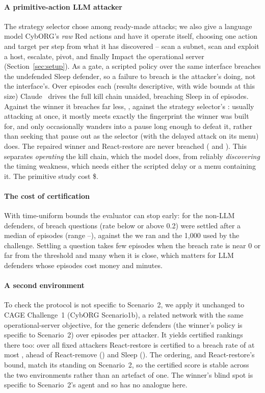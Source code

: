 \documentclass[conference,compsoc]{IEEEtran}
\begin{document}
\paragraph{A primitive-action LLM attacker}
The strategy selector chose among ready-made attacks; we also give a language model
CybORG's \emph{raw} Red actions and have it operate itself, choosing one action and target
per step from what it has discovered -- scan a subnet, scan and exploit a host, escalate,
pivot, and finally Impact the operational server (Section~\ref{sec:setup}). As a gate, a
scripted policy over the same interface breaches the undefended Sleep defender, so a failure
to breach is the attacker's doing, not the interface's. Over \PrimSleepEps{} episodes each
(results descriptive, with wide bounds at this size) Claude~\PrimModel{} drives the full
kill chain unaided, breaching Sleep in \PrimSleepBreach{} of episodes. Against the winner it
breaches far less, \PrimChampBreach{}, against the strategy selector's \AhChampBreach: usually
attacking at once, it mostly meets exactly the fingerprint the winner was built for, and only
occasionally wanders into a pause long enough to defeat it, rather than seeking that pause out
as the selector (with the delayed attack on its menu) does. The repaired winner and
React-restore are never breached (\PrimFixBreach{} and \PrimRestoreBreach). This separates
\emph{operating} the kill chain, which the model does, from reliably \emph{discovering} the
timing weakness, which needs either the scripted delay or a menu containing it. The primitive
study cost \$\PrimCost.

\paragraph{The cost of certification}
With time-uniform bounds the evaluator can stop early: for the non-LLM defenders,
\CgStopResolved{} of \CgStopPairs{} breach questions (rate below or above 0.2) were settled
after a median of \CgStopMedian{} episodes (range \CgStopMin--\CgStopMax), against the
\CgEpisodes{} we ran and the 1,000 used by the challenge. Settling a question takes few
episodes when the breach rate is near 0 or far from the threshold and many when it is
close, which matters for LLM defenders whose episodes cost money and minutes.

\paragraph{A second environment}
To check the protocol is not specific to Scenario~2, we apply it unchanged to CAGE
Challenge~1 (CybORG Scenario1b), a related network with the same operational-server
objective, for the \EnvBDefenders{} generic defenders (the winner's policy is specific to
Scenario~2) over \EnvBEps{} episodes per attacker. It yields certified rankings there too:
over all fixed attackers React-restore is certified to a breach rate of at most
\EnvBRestoreCert, ahead of React-remove (\EnvBRemoveCert) and Sleep (\EnvBSleepCert). The
ordering, and React-restore's bound, match its standing on Scenario~2, so the certified
score is stable across the two environments rather than an artefact of one. The winner's
blind spot is specific to Scenario~2's agent and so has no analogue here.
\end{document}
